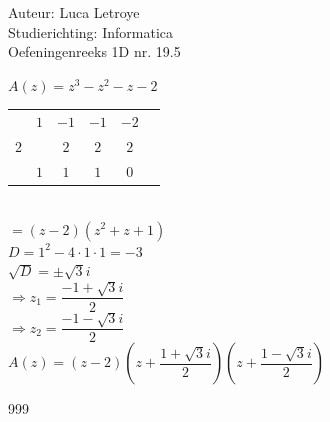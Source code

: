 \documentclass[a4paper]{article}
\begin{document}
  
\noindent \large Auteur: Luca Letroye        \\
\noindent \large Studierichting: Informatica \\
\noindent \large Oefeningenreeks 1D nr. 19.5 \\

\medskip

\normalsize


$A(z) = z^3-z^2-z-2$\\


\begin{tabular}{c|ccccc}
	& $1$ 	& $-1$ 	& $-1$ 	& $-2$ & \\
$2$ 	&  		& $2$ 	& $2$  	& $2$ \\ \hline
	& $1$   	& $1$ 	& $1$ 	& \multicolumn{1}{|c}{$0$}  \\
\end{tabular}\\

$ = (z-2)(z^2+z+1)$ \\

$D = 1^2-4\cdot 1 \cdot 1 = -3$ \\

$\sqrt{D} = \pm \sqrt{3}i$\\

$\Rightarrow z_1 = \dfrac{-1+\sqrt{3}i}{2}$ \\

$\Rightarrow z_2 = \dfrac{-1-\sqrt{3}i}{2}$ \\

 $A(z) = (z-2)\left(z +\dfrac{1+\sqrt{3}i}{2}\right)\left(z+\dfrac{1-\sqrt{3}i}{2}\right)$


\begin{thebibliography}{999}
\end{thebibliography}
\end{document}
